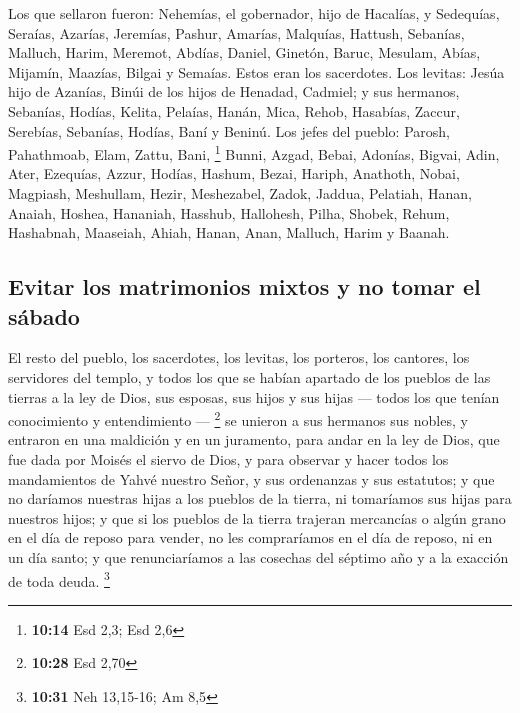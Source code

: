 \begin{paracol}{2}
 Los que sellaron fueron: Nehemías, el gobernador, hijo de
Hacalías, y Sedequías,  Seraías, Azarías, Jeremías,
 Pashur, Amarías, Malquías,  Hattush,
Sebanías, Malluch,  Harim, Meremot, Abdías, 
Daniel, Ginetón, Baruc,  Mesulam, Abías, Mijamín,
 Maazías, Bilgai y Semaías. Estos eran los sacerdotes.
 Los levitas: Jesúa hijo de Azanías, Binúi de los hijos de
Henadad, Cadmiel;  y sus hermanos, Sebanías, Hodías,
Kelita, Pelaías, Hanán,  Mica, Rehob, Hasabías,
 Zaccur, Serebías, Sebanías,  Hodías, Baní
y Beninú.  Los jefes del pueblo: Parosh, Pahathmoab,
Elam, Zattu, Bani, \footnote{\textbf{10:14} Esd 2,3; Esd 2,6}
 Bunni, Azgad, Bebai,  Adonías, Bigvai,
Adin,  Ater, Ezequías, Azzur,  Hodías,
Hashum, Bezai,  Hariph, Anathoth, Nobai, 
Magpiash, Meshullam, Hezir,  Meshezabel, Zadok, Jaddua,
 Pelatiah, Hanan, Anaiah,  Hoshea,
Hananiah, Hasshub,  Hallohesh, Pilha, Shobek,
 Rehum, Hashabnah, Maaseiah,  Ahiah,
Hanan, Anan,  Malluch, Harim y Baanah.

\hypertarget{evitar-los-matrimonios-mixtos-y-no-tomar-el-suxe1bado}{%
\subsection{Evitar los matrimonios mixtos y no tomar el
sábado}\label{evitar-los-matrimonios-mixtos-y-no-tomar-el-suxe1bado}}

 El resto del pueblo, los sacerdotes, los levitas, los
porteros, los cantores, los servidores del templo, y todos los que se
habían apartado de los pueblos de las tierras a la ley de Dios, sus
esposas, sus hijos y sus hijas --- todos los que tenían conocimiento y
entendimiento --- \footnote{\textbf{10:28} Esd 2,70}  se
unieron a sus hermanos sus nobles, y entraron en una maldición y en un
juramento, para andar en la ley de Dios, que fue dada por Moisés el
siervo de Dios, y para observar y hacer todos los mandamientos de Yahvé
nuestro Señor, y sus ordenanzas y sus estatutos;  y que
no daríamos nuestras hijas a los pueblos de la tierra, ni tomaríamos sus
hijas para nuestros hijos;  y que si los pueblos de la
tierra trajeran mercancías o algún grano en el día de reposo para
vender, no les compraríamos en el día de reposo, ni en un día santo; y
que renunciaríamos a las cosechas del séptimo año y a la exacción de
toda deuda. \footnote{\textbf{10:31} Neh 13,15-16; Am 8,5}


\end{paracol}
